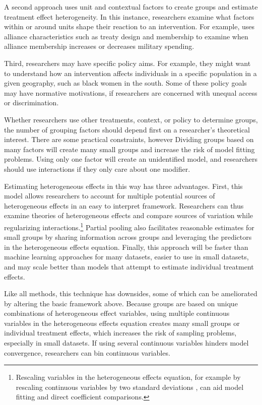 \documentclass[12pt]{article}
\begin{document}
A second approach uses unit and contextual factors to create groups and estimate treatment effect heterogeneity. 
In this instance, researchers examine what factors within or around units shape their reaction to an intervention.
For example, \citet{Alley2021isq} uses alliance characteristics such as treaty design and membership to examine when alliance membership increases or decreases military spending.


Third, researchers may have specific policy aims.
For example, they might want to understand how an intervention affects individuals in a specific population in a given geography, such as black women in the south. 
Some of these policy goals may have normative motivations, if researchers are concerned with unequal access or discrimination.


Whether researchers use other treatments, context, or policy to determine groups, the number of grouping factors should depend first on a researcher's theoretical interest.
There are some practical constraints, however
Dividing groups based on many factors will create many small groups and increase the risk of model fitting problems. 
Using only one factor will create an unidentified model, and researchers should use interactions if they only care about one modifier. 


Estimating heterogeneous effects in this way has three advantages.
First, this model allows researchers to account for multiple potential sources of heterogeneous effects in an easy to interpret framework. 
Researchers can thus examine theories of heterogeneous effects and compare sources of variation while regularizing interactions.\footnote{Rescaling variables in the heterogeneous effects equation, for example by rescaling continuous variables by two standard deviations \citep{Gelman2008}, can aid model fitting and direct coefficient comparisons.} 
Partial pooling also facilitates reasonable estimates for small groups by sharing information across groups and leveraging the predictors in the heterogeneous effects equation. 
Finally, this approach will be faster than machine learning approaches for many datasets, easier to use in small datasets, and may scale better than models that attempt to estimate individual treatment effects.


Like all methods, this technique has downsides, some of which can be ameliorated by altering the basic framework above. 
Because groups are based on unique combinations of heterogeneous effect variables, using multiple continuous variables in the heterogeneous effects equation creates many small groups or individual treatment effects, which increases the risk of sampling problems, especially in small datasets. 
If using several continuous variables hinders model convergence, researchers can bin continuous variables.
\end{document}
